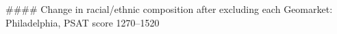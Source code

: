 #### Change in racial/ethnic composition after excluding each Geomarket: Philadelphia, PSAT score 1270–1520
